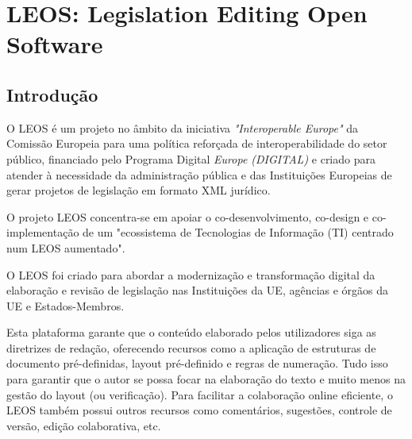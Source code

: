 \chapter{LEOS: Legislation Editing Open Software}

\section{Introdução}

O LEOS é um projeto no âmbito da iniciativa \emph{"Interoperable Europe"} da Comissão Europeia para uma política reforçada de 
interoperabilidade do setor público, financiado pelo Programa Digital \emph{Europe (DIGITAL)} e criado para atender à 
necessidade da administração pública e das Instituições Europeias de gerar projetos de legislação em formato XML jurídico.

O projeto LEOS concentra-se em apoiar o co-desenvolvimento, co-design e co-implementação de um "ecossistema de Tecnologias de 
Informação (TI) centrado num LEOS aumentado".

O LEOS foi criado para abordar a modernização e transformação digital da elaboração e revisão de legislação nas 
Instituições da UE, agências e órgãos da UE e Estados-Membros.

Esta plataforma garante que o conteúdo elaborado pelos utilizadores siga as diretrizes de redação, oferecendo recursos como a
aplicação de estruturas de documento pré-definidas, layout pré-definido e regras de numeração. 
Tudo isso para garantir que o autor se possa focar na elaboração do texto e muito menos na gestão do layout (ou verificação). 
Para facilitar a colaboração online eficiente, o LEOS também possui outros recursos como comentários, sugestões, 
controle de versão, edição colaborativa, etc.

